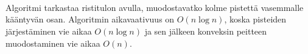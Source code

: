 \\\\\\
Algoritmi tarkastaa ristitulon avulla,
muodostavatko kolme pistettä vasemmalle
kääntyvän osan.
Algoritmin aikavaativuus on $O(n \log n)$,
koska pisteiden järjestäminen vie aikaa $O(n \log n)$
ja sen jälkeen konveksin peitteen muodostaminen
vie aikaa $O(n)$.




